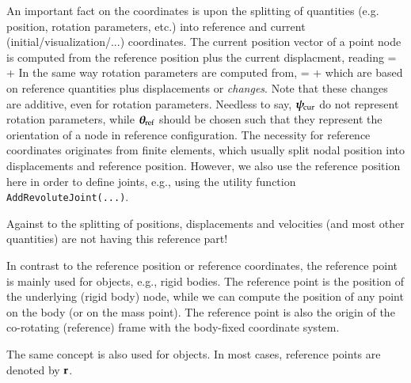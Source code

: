 %
%
An important fact on the coordinates is upon the splitting of quantities (e.g. position, rotation parameters, etc.) into reference and current (initial/visualization/...) coordinates.
The current position vector of a point node is computed from the reference position plus the current displacment, reading
\be
  \pv\cCur = \pv\cRef + \uv\cCur
\ee
In the same way rotation parameters are computed from,
\be
  \ttheta\cCur = \ttheta\cRef + \tpsi\cCur
\ee
which are based on reference quantities plus displacements or {\it changes}. Note that these changes are additive, even for rotation parameters. Needless to say, $\mbox{\boldmath $\psi$ \unboldmath}\!\!_\mathrm{cur}$ do not represent rotation parameters, while $\mbox{\boldmath $\theta$ \unboldmath}\!\!_\mathrm{ref}$ should be chosen such that they represent the orientation of a node in reference configuration.
The necessity for reference coordinates originates from finite elements, which usually split nodal position into displacements and reference position.
However, we also use the reference position here in order to define joints, e.g., using the utility function \texttt{AddRevoluteJoint(...)}.

Against to the splitting of positions, displacements and velocities (and most other quantities) are not having this reference part!

%
In contrast to the reference position or reference coordinates, the reference point is mainly used for objects, e.g., rigid bodies.
The reference point is the position of the underlying (rigid body) node, while we can compute the position of any point on the body (or on the mass point).
The reference point is also the origin of the co-rotating (reference) frame with the body-fixed coordinate system.

The same concept is also used for  objects. In most cases, reference points are denoted by $\mathbf{r}$.

